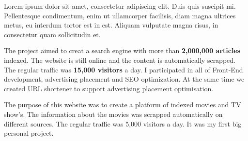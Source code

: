 \documentclass[letterpaper]{deedy-resume} %
\begin{document}
\begin{minipage}[t]{0.66\textwidth}

Lorem ipsum dolor sit amet, consectetur adipiscing elit. Duis quis suscipit mi. Pellentesque condimentum, enim ut ullamcorper facilisis, diam magna ultrices metus, eu interdum tortor est in est. Aliquam vulputate magna risus, in consectetur quam sollicitudin et.

\sectionspace %



The project aimed to creat a search engine with more than \textbf{2,000,000 articles} indexed. The website is still online and the content is automatically scrapped. The regular traffic was \textbf{15,000 visitors} a day. I participated in all of Front-End development, advertising placement and SEO optimization. At the same time we created URL shortener to support advertising placement optimisation.

\sectionspace %



The purpose of this website was to create a platform of indexed movies and TV show’s. The information about the movies was scrapped automatically on different sources. The regular traffic was 5,000 visitors a day. It was my first big personal project.

\sectionspace %

\end{minipage}
\end{document}
